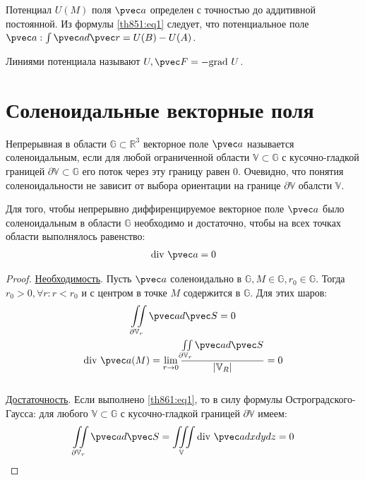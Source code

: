 \begin{remark}
  Потенциал $U(M)$ поля $\pvec a$ определен с точностью до аддитивной
  постоянной. Из формулы \eqref{th851:eq1} следует, что потенциальное поле
  $\pvec a: \int \pvec a d \pvec r = U(B) - U(A)$.
\end{remark}

\begin{remark}
  Линиями потенциала называют $U, \pvec F = -\mbox{grad} \ U$.
\end{remark}

\section{Соленоидальные векторные поля}
\begin{definition}
  Непрерывная в области $\mathbb{G} \subset \mathbb{R}^3$ векторное поле $\pvec
  a$ называется соленоидальным, если для любой ограниченной области $\mathbb{V}
  \subset \mathbb{G}$ с кусочно-гладкой границей $\partial \mathbb{V} \subset
  \mathbb{G}$ его поток через эту границу равен 0.
  Очевидно, что понятия соленоидальности не зависит от выбора ориентации на
  границе $\partial \mathbb{V}$ обалсти $\mathbb{V}$.
\end{definition}

\begin{theorem}
  Для того, чтобы непрерывно диффиренцируемое векторное поле $\pvec a$ было
  соленоидальным в области $\mathbb{G}$ необходимо и достаточно, чтобы на всех
  точках области выполнялось равенство:
  \begin{gather}
    \mbox{div} \ \pvec a = 0
    \label{th861:eq1}
  \end{gather}
\end{theorem}

\begin{proof}
  \underline{Необходимость}. Пусть $\pvec a$ соленоидально в $\mathbb{G}, M \in
  \mathbb{G}, r_0 \in \mathbb{G}$. Тогда $r_0 > 0, \forall r : r < r_0$ и с
  центром в точке $M$ содержится в $\mathbb{G}$. Для этих шаров:
  \begin{gather*}
    \iint\limits_{\partial \mathbb{V}_r} \pvec a d \pvec S = 0 \\
    \mbox{div} \ \pvec a(M) = \lim\limits_{r \to 0}
    \frac{\iint\limits_{\partial \mathbb{V}_r} \pvec a d \pvec
    S}{|\mathbb{V}_R|} = 0
  \end{gather*} \\

  \underline{Достаточность}. Если выполнено \eqref{th861:eq1}, то в силу
  формулы Остроградского-Гаусса: для любого $\mathbb{V} \subset \mathbb{G}$ с
  кусочно-гладкой границей $\partial \mathbb{V}$ имеем:
  \begin{gather*}
    \iint\limits_{\partial \mathbb{V}_r} \pvec a d \pvec S =
    \iiint\limits_{\mathbb{V}} \mbox{div} \ \pvec a dx dy dz = 0
  \end{gather*}
\end{proof}

